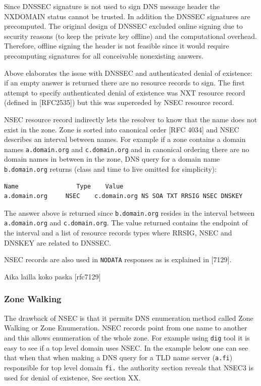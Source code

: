 Since DNSSEC signature is not used to sign DNS message header the NXDOMAIN status cannot be trusted. In addition the DNSSEC signatures are precomputed. The original design of DNSSEC excluded online signing due to security reasons (to keep the private key offline) and the computational overhead. Therefore, offline signing the header is not feasible since it would require precomputing signatures for all conceivable nonexisting answers.

Above elaborates the issue with DNSSEC and authenticated denial of existence: if an empty answer is returned there are no resource records to sign. The first attempt to specify authenticated denial of existence was NXT resource record (defined in [RFC2535]) but this was superceded by NSEC resource record.

NSEC resource record indirectly lets the resolver to know that the name does not exist in the zone. Zone is sorted into canonical order [RFC 4034] and NSEC describes an interval between names. For example if a zone contains a domain names \texttt{a.domain.org} and \texttt{c.domain.org} and in canonical ordering there are no domain names in between in the zone, DNS query for a domain name \texttt{b.domain.org} returns (class and time to live omitted for simplicity):

\begin{verbatim}
Name	            Type    Value
a.domain.org     NSEC    c.domain.org NS SOA TXT RRSIG NSEC DNSKEY
\end{verbatim}

The answer above is returned since \texttt{b.domain.org} resides in the interval between \texttt{a.domain.org} and \texttt{c.domain.org}. The value returned contains the endpoint of the interval and a list of resource records types where RRSIG, NSEC and DNSKEY are related to DNSSEC.

NSEC records are also used in \texttt{NODATA} responses as is explained in [7129].

Aika lailla koko paska [rfc7129]

\subsubsection{Zone Walking}

The drawback of NSEC is that it permits DNS enumeration method called Zone Walking or Zone Enumeration. NSEC records point from one name to another and this allows enumeration of the whole zone. For example using \texttt{dig} tool it is easy to see if a top level domain uses NSEC. In the example below one can see that when that when making a DNS query for a TLD name server (\texttt{a.fi}) responsible for top level domain \texttt{fi.} the authority section reveals that NSEC3 is used for denial of existence, See section XX.

